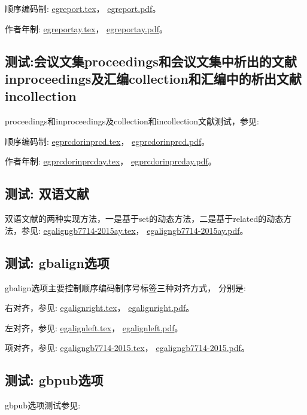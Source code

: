 顺序编码制:
\href{run:./example/egreport.tex}{egreport.tex}，
\href{run:./example/egreport.pdf}{egreport.pdf}。

作者年制:
\href{run:./example/egreportay.tex}{egreportay.tex}，
\href{run:./example/egreportay.pdf}{egreportay.pdf}。


\subsection{测试:会议文集proceedings和会议文集中析出的文献inproceedings及汇编collection和汇编中的析出文献incollection}

proceedings和inproceedings及collection和incollection文献测试，参见:

顺序编码制:
\href{run:./example/egprcdorinprcd.tex}{egprcdorinprcd.tex}，
\href{run:./example/egprcdorinprcd.pdf}{egprcdorinprcd.pdf}。

作者年制:
\href{run:./example/egprcdorinprcday.tex}{egprcdorinprcday.tex}，
\href{run:./example/egprcdorinprcday.pdf}{egprcdorinprcday.pdf}。

\subsection{测试: 双语文献}\label{sec:doublelang:test}

双语文献的两种实现方法，一是基于set的动态方法，二是基于related的动态方法，参见:
\href{run:./example/egaligngb7714-2015ay.tex}{egaligngb7714-2015ay.tex}，
\href{run:./example/egaligngb7714-2015ay.pdf}{egaligngb7714-2015ay.pdf}。

\subsection{测试: gbalign选项}\label{sec:align:test}
gbalign选项主要控制顺序编码制序号标签三种对齐方式，
分别是:

右对齐，参见:
\href{run:./example/egalignright.tex}{egalignright.tex}，
\href{run:./example/egalignright.pdf}{egalignright.pdf}。

左对齐，参见:
\href{run:./example/egalignleft.tex}{egalignleft.tex}，
\href{run:./example/egalignleft.pdf}{egalignleft.pdf}。

项对齐，参见:
\href{run:./example/egaligngb7714-2015.tex}{egaligngb7714-2015.tex}，
\href{run:./example/egaligngb7714-2015.pdf}{egaligngb7714-2015.pdf}。

\subsection{测试: gbpub选项}\label{sec:opt:gbpub}
gbpub选项测试参见:

